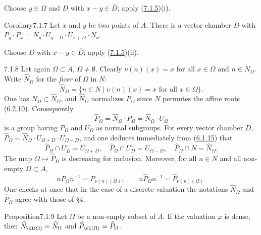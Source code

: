 \documentclass[12pt,a4paper,oneside,english]{smfart}
\makeatletter
\newcommand{\btanchor}[1]{\leavevmode\Hy@raisedlink{\hypertarget{bt:#1}{}}}
\newcommand{\btref}[1]{\hyperlink{bt:#1}{#1}}
\theoremstyle{definition}
\theoremstyle{bt}
\makeatother
\begin{document}
\begin{sketch}
Choose $y\in\Omega$ and $D$ with $x-y\in\overline{D}$; apply (\btref{7.1.5})(i).
\end{sketch}

\begin{bt}{Corollary}{7.1.7}\btanchor{7.1.7}
Let $x$ and $y$ be two points of $A$. There is a vector chamber $D$ with
$P_y\cdot P_x=N_y\cdot U_{y-D}\cdot U_{x+D}\cdot N_x$.
\end{bt}

\begin{sketch}
Choose $D$ with $x-y\in\overline{D}$; apply (\btref{7.1.5})(ii).
\end{sketch}

\begin{btpar}{7.1.8}
Let again $\Omega\subset A$, $\Omega\ne\emptyset$. Clearly
$\nu(n)(x)=x$ for all $x\in\Omega$ and $n\in N_\Omega$. Write
$\widehat{N}_\Omega$ for the \emph{fixer} of $\Omega$ in $N$:
\[
  \widehat{N}_\Omega=\{n\in N\mid \nu(n)(x)=x \text{ for all } x\in\Omega\}.
\]
One has $N_\Omega\subset\widehat{N}_\Omega$, and $\widehat{N}_\Omega$
normalizes $P_\Omega$ since $N$ permutes the affine roots (\btref{6.2.10}).
Consequently
\[
  \widehat{P}_\Omega=\widehat{N}_\Omega\cdot P_\Omega
                    =\widehat{N}_\Omega\cdot U_\Omega
\]
is a group having $P_\Omega$ and $U_\Omega$ as normal subgroups. For
every vector chamber $D$,
$\widehat{P}_\Omega=\widehat{N}_\Omega\cdot U_{\Omega+D}\cdot U_{\Omega-D}$,
and one deduces immediately from (\btref{6.1.15}) that
\begin{equation}
  \widehat{P}_\Omega\cap U^{+}_{D}=U_{\Omega+D},\quad
  \widehat{P}_\Omega\cap U^{-}_{D}=U_{\Omega-D},\quad
  \widehat{P}_\Omega\cap N=\widehat{N}_\Omega .
  \tag{1}
\end{equation}
The map $\Omega\mapsto\widehat{P}_\Omega$ is decreasing for inclusion.
Moreover, for all $n\in N$ and all non-empty $\Omega\subset A$,
\[
  nP_\Omega n^{-1}=P_{\nu(n)(\Omega)},\qquad   n\widehat{P}_\Omega n^{-1}=\widehat{P}_{\nu(n)(\Omega)} .
\]
One checks at once that in the case of a discrete valuation the
notations $\widehat{N}_\Omega$ and $\widehat{P}_\Omega$ agree with those
of \S4.
\end{btpar}

\begin{bt}{Proposition}{7.1.9}\btanchor{7.1.9}
Let $\Omega$ be a non-empty subset of $A$. If the valuation $\varphi$ is
dense, then $\widehat{N}_{\cl(\Omega)}=\widehat{N}_\Omega$ and
$\widehat{P}_{\cl(\Omega)}=\widehat{P}_\Omega$.
\end{bt}
\end{document}

